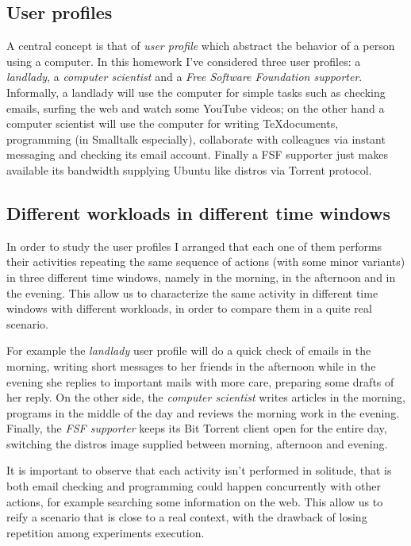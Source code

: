\documentclass[10pt,a4paper]{article}
\begin{document}
    \subsection{User profiles}
    A central concept is that of \emph{user profile} which abstract
    the behavior of a person using a computer. In this homework I've
    considered three user profiles: a \emph{landlady}, a
    \emph{computer scientist} and a \emph{Free Software Foundation
      supporter}. Informally, a landlady will use the computer for
    simple tasks such as checking emails, surfing the web and watch
    some YouTube videos; on the other hand a computer scientist will
    use the computer for writing \TeX documents, programming (in
    Smalltalk especially), collaborate with colleagues via instant
    messaging and checking its email account. Finally a FSF supporter
    just makes available its bandwidth supplying Ubuntu like distros
    via Torrent protocol.

    \subsection{Different workloads in different time windows}
    In order to study the user profiles I arranged that each one of
    them performs their activities repeating the same sequence of
    actions (with some minor variants) in three different time
    windows, namely in the morning, in the afternoon and in the
    evening. This allow us to characterize the same activity in
    different time windows with different workloads, in order to
    compare them in a quite real scenario.

    For example the \emph{landlady} user profile will do a quick check
    of emails in the morning, writing short messages to her friends in
    the afternoon while in the evening she replies to important mails
    with more care, preparing some drafts of her reply.  On the other
    side, the \emph{computer scientist} writes articles in the
    morning, programs in the middle of the day and reviews the morning
    work in the evening.  Finally, the \emph{FSF supporter} keeps its
    Bit Torrent client open for the entire day, switching the distros
    image supplied between morning, afternoon and evening.

    It is important to observe that each activity isn't performed in
    solitude, that is both email checking and programming could happen
    concurrently with other actions, for example searching some
    information on the web. This allow us to reify a scenario that is
    close to a real context, with the drawback of losing repetition
    among experiments execution.
\end{document}
